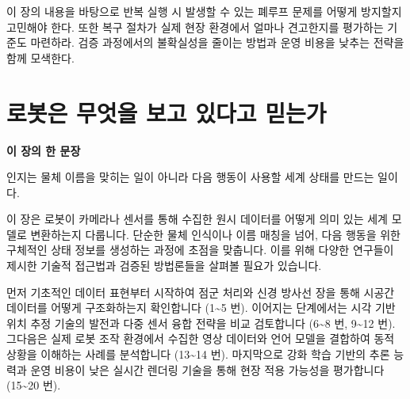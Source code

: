 \documentclass[11pt,openany]{book}
\newcommand{\chaptertakeaway}[1]{%
  \begin{tcolorbox}[
    breakable,
    colback=deepblue,
    colframe=deepblue,
    coltext=white,
    boxrule=0pt,
    arc=2mm,
    left=5mm,right=5mm,top=4mm,bottom=4mm
  ]
  {\sffamily\bfseries\large 이 장의 한 문장}\par\smallskip
  #1
  \end{tcolorbox}
}
\begin{document}
\begin{translationbox}[이 장을 덮기 전에]

이 장의 내용을 바탕으로 반복 실행 시 발생할 수 있는 폐루프 문제를 어떻게 방지할지 고민해야 한다. 또한 복구 절차가 실제 현장 환경에서 얼마나 견고한지를 평가하는 기준도 마련하라. 검증 과정에서의 불확실성을 줄이는 방법과 운영 비용을 낮추는 전략을 함께 모색한다.

\end{translationbox}

\cleardoublepage

\chapter{로봇은 무엇을 보고 있다고 믿는가}

\chaptertakeaway{인지는 물체 이름을 맞히는 일이 아니라 다음 행동이 사용할 세계 상태를 만드는 일이다.}

이 장은 로봇이 카메라나 센서를 통해 수집한 원시 데이터를 어떻게 의미 있는 세계 모델로 변환하는지 다룹니다. 단순한 물체 인식이나 이름 매칭을 넘어, 다음 행동을 위한 구체적인 상태 정보를 생성하는 과정에 초점을 맞춥니다. 이를 위해 다양한 연구들이 제시한 기술적 접근법과 검증된 방법론들을 살펴볼 필요가 있습니다.

\begin{boardbox}[읽는 순서]

먼저 기초적인 데이터 표현부터 시작하여 점군 처리와 신경 방사선 장을 통해 시공간 데이터를 어떻게 구조화하는지 확인합니다 (1\textasciitilde{}5 번). 이어지는 단계에서는 시각 기반 위치 추정 기술의 발전과 다중 센서 융합 전략을 비교 검토합니다 (6\textasciitilde{}8 번, 9\textasciitilde{}12 번). 그다음은 실제 로봇 조작 환경에서 수집한 영상 데이터와 언어 모델을 결합하여 동적 상황을 이해하는 사례를 분석합니다 (13\textasciitilde{}14 번). 마지막으로 강화 학습 기반의 추론 능력과 운영 비용이 낮은 실시간 렌더링 기술을 통해 현장 적용 가능성을 평가합니다 (15\textasciitilde{}20 번).

\end{boardbox}
\end{document}
